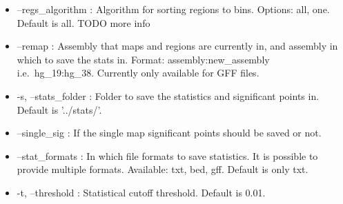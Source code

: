 \begin{itemize}
\item --regs\_algorithm : Algorithm for sorting regions to bins. Options: all, one. Default is all. TODO more info
\item --remap : Assembly that maps and regions are currently in, and assembly in which to save the stats in. Format:
assembly:new\_assembly i.e.~hg\_19:hg\_38. Currently only available for GFF files.
\item -s, --stats\_folder : Folder to save the statistics and significant points in. Default is '../stats/'.
\item --single\_sig : If the single map significant points should be saved or not.
\item --stat\_formats : In which file formats to save statistics. It is possible to provide multiple formats. Available:
txt, bed, gff. Default is only txt.
\item -t, --threshold : Statistical cutoff threshold. Default is 0.01.
\end{itemize}



